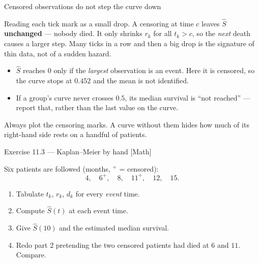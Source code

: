 \documentclass[aspectratio=169,11pt]{beamer}
\begin{document}
\begin{frame}{Censored observations do not step the curve down}
  \footnotesize
  \begin{mistake}
  \scriptsize
    Reading each tick mark as a small drop. A censoring at time $c$ leaves $\hat S$
    \textbf{unchanged} --- nobody died. It only shrinks $r_k$ for all $t_k>c$, so the
    \emph{next} death causes a larger step. Many ticks in a row and then a big drop is
    the signature of thin data, not of a sudden hazard.
  \end{mistake}
  \begin{readme}
    \begin{itemize}
      \item $\hat S$ reaches $0$ only if the \emph{largest} observation is an event. Here
            it is censored, so the curve stops at $0.452$ and the mean is not identified.
      \item If a group's curve never crosses $0.5$, its median survival is
            ``not reached'' --- report that, rather than the last value on the curve.
    \end{itemize}
  \end{readme}
  \begin{takeaway}
    Always plot the censoring marks. A curve without them hides how much of its
    right-hand side rests on a handful of patients.
  \end{takeaway}
\end{frame}

\begin{frame}{Exercise 11.3 --- Kaplan--Meier by hand [Math]}
\begin{exercise}
  Six patients are followed (months, $^{+}$ = censored):
  \[
    4,\quad 6^{+},\quad 8,\quad 11^{+},\quad 12,\quad 15 .
  \]
  \begin{enumerate}
    \item Tabulate $t_k$, $r_k$, $d_k$ for every \emph{event} time.
    \item Compute $\hat S(t)$ at each event time.
    \item Give $\hat S(10)$ and the estimated median survival.
    \item Redo part 2 pretending the two censored patients had died at $6$ and $11$.
          Compare.
  \end{enumerate}
\end{exercise}
\end{frame}
\end{document}
